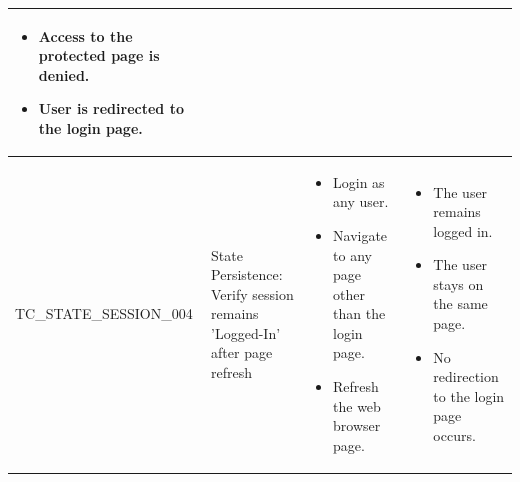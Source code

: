 \documentclass[10pt, a4paper]{report}
\begin{document}
\begin{longtable}{|>{\raggedright\arraybackslash}p{4cm}|>{\raggedright\arraybackslash}p{4cm}|>{\raggedright\arraybackslash}p{4.5cm}|>{\raggedright\arraybackslash}p{4cm}|}
\begin{itemize}[noitemsep, topsep=0pt, partopsep=0pt, leftmargin=*]
        \item Access to the protected page is denied.
        \item User is redirected to the login page.
    \end{itemize} \\ \hline
TC\_STATE\_SESSION\_004 & State Persistence: Verify session remains 'Logged-In' after page refresh & 
    \begin{itemize}[noitemsep, topsep=0pt, partopsep=0pt, leftmargin=*]
        \item Login as any user.
        \item Navigate to any page other than the login page.
        \item Refresh the web browser page.
    \end{itemize} & 
    \begin{itemize}[noitemsep, topsep=0pt, partopsep=0pt, leftmargin=*]
        \item The user remains logged in.
        \item The user stays on the same page.
        \item No redirection to the login page occurs.
    \end{itemize} \\ \hline
    
\end{longtable}
\end{document}
